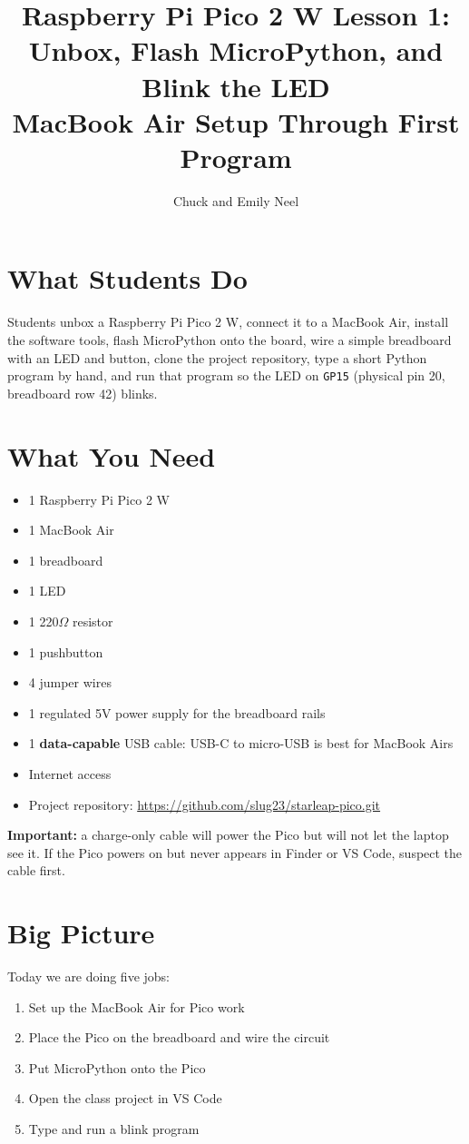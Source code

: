 \documentclass[11pt,letterpaper]{article}
\title{Raspberry Pi Pico 2 W Lesson 1: Unbox, Flash MicroPython, and Blink the LED\\\large MacBook Air Setup Through First Program}
\author{Chuck and Emily Neel}
\date{}
\begin{document}
\maketitle
\vspace{-1.0em}
\small

\section*{What Students Do}
Students unbox a Raspberry Pi Pico 2 W, connect it to a MacBook Air, install the software tools, flash MicroPython onto the board, wire a simple breadboard with an LED and button, clone the project repository, type a short Python program by hand, and run that program so the LED on \texttt{GP15} (physical pin 20, breadboard row 42) blinks.

\section*{What You Need}
\begin{itemize}
    \item 1 Raspberry Pi Pico 2 W
    \item 1 MacBook Air
    \item 1 breadboard
    \item 1 LED
    \item 1 220$\Omega$ resistor
    \item 1 pushbutton
    \item 4 jumper wires
    \item 1 regulated 5V power supply for the breadboard rails
    \item 1 \textbf{data-capable} USB cable: USB-C to micro-USB is best for MacBook Airs
    \item Internet access
    \item Project repository: \url{https://github.com/slug23/starleap-pico.git}
\end{itemize}

\textbf{Important:} a charge-only cable will power the Pico but will not let the laptop see it. If the Pico powers on but never appears in Finder or VS Code, suspect the cable first.

\section*{Big Picture}
Today we are doing five jobs:
\begin{enumerate}
    \item Set up the MacBook Air for Pico work
    \item Place the Pico on the breadboard and wire the circuit
    \item Put MicroPython onto the Pico
    \item Open the class project in VS Code
    \item Type and run a blink program
\end{enumerate}
\end{document}
